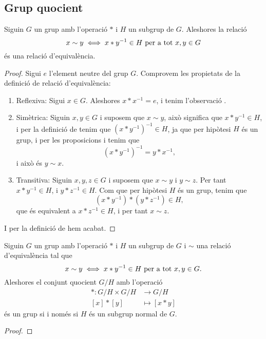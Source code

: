 \documentclass[../Apunts.tex]{subfiles}
\begin{document}
	\subsection{Grup quocient}
	\begin{proposition}
		\label{prop:relacio entre grups és d'equivalència}
		\label{TODO:grup quocient}
		Siguin \(G\) un grup amb l'operació \(\ast\) i \(H\) un subgrup de \(G\). Aleshores la relació
		\[x\sim y\iff x\ast y^{-1}\in H\text{ per a tot }x,y\in G\]
		és una relació d'equivalència.
		\begin{proof}
			Sigui \(e\) l'element neutre del grup \(G\). Comprovem les propietats de la definició de relació d'equivalència:
			\begin{enumerate}
				\item Reflexiva: Sigui \(x\in G\). Aleshores \(x\ast x^{-1}=e\), i tenim l'observació .
				\item Simètrica: Siguin \(x,y\in G\) i suposem que \(x\sim y\), això significa que \(x\ast y^{-1}\in H\), i per la definició de  tenim que \((x\ast y^{-1})^{-1}\in H\), ja que per hipòtesi \(H\) és un grup, i per les proposicions  i  tenim que
				\[(x\ast y^{-1})^{-1}=y\ast x^{-1},\]
				i això és \(y\sim x\).
				\item Transitiva: Siguin \(x,y,z\in G\) i suposem que \(x\sim y\) i \(y\sim z\). Per tant \(x\ast y^{-1}\in H\), i \(y\ast z^{-1}\in H\). Com que per hipòtesi \(H\) és un grup, tenim que
				\[(x\ast y^{-1})\ast(y\ast z^{-1})\in H,\]
				que és equivalent a \(x\ast z^{-1}\in H\), i per tant \(x\sim z\).
			\end{enumerate}
			I per la definició de  hem acabat.
		\end{proof}
	\end{proposition}
	\begin{proposition}\label{prop:grup quocient}
		Siguin \(G\) un grup amb l'operació \(\ast\) i \(H\) un subgrup de \(G\) i \(\sim\) una relació d'equivalència tal que
		\[x\sim y\iff x\ast y^{-1}\in H\text{ per a tot }x,y\in G.\]
		Aleshores el conjunt quocient \(G/H\) amb l'operació
		\begin{align*}
		\ast\colon G/H\times G/H&\longrightarrow G/H\\
		[x]\ast[y]&\longmapsto[x\ast y]
		\end{align*}
		és un grup si i només si \(H\) és un subgrup normal de \(G\).
		\begin{proof}
		\end{proof}
	\end{proposition}
\end{document}
